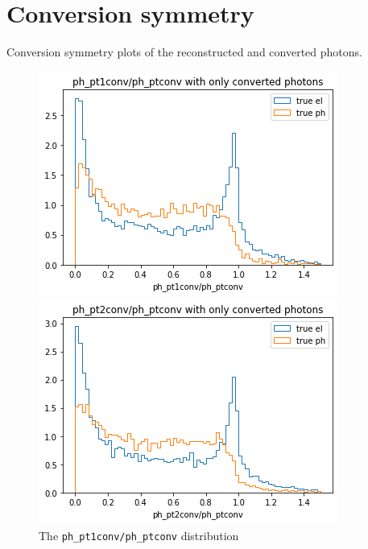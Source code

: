 \documentclass[a4paper, oneside]{book}
\begin{document}
		
		
	
	
	
	
	
	
	
	\appendix
	\chapter{Conversion symmetry} \label{Appex: sym}
		Conversion symmetry plots of the reconstructed and converted photons. %
		\begin{figure}[H]  
			\begin{minipage}[b]{0.5\linewidth}
				\centering
				\includegraphics[width=.9\linewidth]{tesi_images/pt1_pt.png} 
				\caption{The \texttt{ph\_pt1conv/ph\_ptconv} distribution} 
				\label{fig: pt1/pt}
				\vspace{4ex}
			\end{minipage}%
			\begin{minipage}[b]{0.5\linewidth}
				\centering
				\includegraphics[width=.9\linewidth]{tesi_images/pt2_pt.png} 

\end{minipage}
\end{figure}
\end{document}
